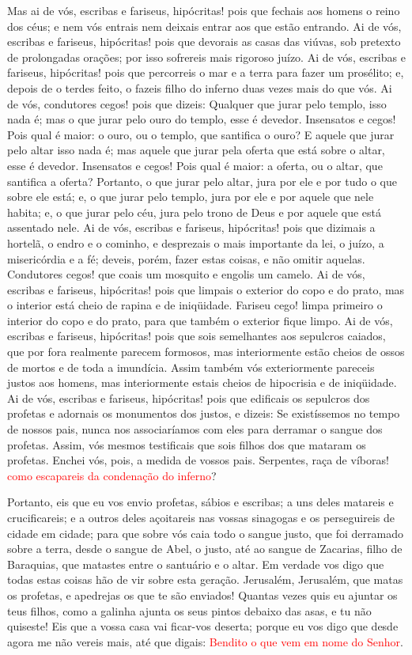 Mas ai de vós, escribas e fariseus, hipócritas! pois que fechais
aos homens o reino dos céus; e nem vós entrais nem deixais entrar
aos que estão entrando. Ai de vós, escribas e fariseus,
hipócritas! pois que devorais as casas das viúvas, sob pretexto de
prolongadas orações; por isso sofrereis mais rigoroso juízo.
Ai de vós, escribas e fariseus, hipócritas! pois que
percorreis o mar e a terra para fazer um prosélito; e, depois de o
terdes feito, o fazeis filho do inferno duas vezes mais do que vós.
Ai de vós, condutores cegos! pois que dizeis: Qualquer que
jurar pelo templo, isso nada é; mas o que jurar pelo ouro do templo,
esse é devedor. Insensatos e cegos! Pois qual é maior: o
ouro, ou o templo, que santifica o ouro? E aquele que jurar
pelo altar isso nada é; mas aquele que jurar pela oferta que está
sobre o altar, esse é devedor. Insensatos e cegos! Pois qual
é maior: a oferta, ou o altar, que santifica a oferta?
Portanto, o que jurar pelo altar, jura por ele e por tudo o
que sobre ele está; e, o que jurar pelo templo, jura por ele
e por aquele que nele habita; e, o que jurar pelo céu, jura
pelo trono de Deus e por aquele que está assentado nele. Ai
de vós, escribas e fariseus, hipócritas! pois que dizimais a
hortelã, o endro e o cominho, e desprezais o mais importante da lei,
o juízo, a misericórdia e a fé; deveis, porém, fazer estas coisas, e
não omitir aquelas. Condutores cegos! que coais um mosquito e
engolis um camelo. Ai de vós, escribas e fariseus,
hipócritas! pois que limpais o exterior do copo e do prato, mas o
interior está cheio de rapina e de iniqüidade. Fariseu cego!
limpa primeiro o interior do copo e do prato, para que também o
exterior fique limpo. Ai de vós, escribas e fariseus,
hipócritas! pois que sois semelhantes aos sepulcros caiados, que por
fora realmente parecem formosos, mas interiormente estão cheios de
ossos de mortos e de toda a imundícia. Assim também vós
exteriormente pareceis justos aos homens, mas interiormente estais
cheios de hipocrisia e de iniqüidade. Ai de vós, escribas e
fariseus, hipócritas! pois que edificais os sepulcros dos profetas e
adornais os monumentos dos justos, e dizeis: Se existíssemos
no tempo de nossos pais, nunca nos associaríamos com eles para
derramar o sangue dos profetas. Assim, vós mesmos testificais
que sois filhos dos que mataram os profetas. Enchei vós,
pois, a medida de vossos pais. Serpentes, raça de víboras!
\textcolor{red}{como escapareis da condenação do inferno}?

Portanto, eis que eu vos envio profetas, sábios e escribas; a uns
deles matareis e crucificareis; e a outros deles açoitareis nas
vossas sinagogas e os perseguireis de cidade em cidade; para
que sobre vós caia todo o sangue justo, que foi derramado sobre a
terra, desde o sangue de Abel, o justo, até ao sangue de Zacarias,
filho de Baraquias, que matastes entre o santuário e o altar.
Em verdade vos digo que todas estas coisas hão de vir sobre
esta geração. Jerusalém, Jerusalém, que matas os profetas, e
apedrejas os que te são enviados! Quantas vezes quis eu ajuntar os
teus filhos, como a galinha ajunta os seus pintos debaixo das asas,
e tu não quiseste! Eis que a vossa casa vai ficar-vos
deserta; porque eu vos digo que desde agora me não vereis
mais, até que digais: \textcolor{red}{Bendito o que vem em nome do Senhor}.

